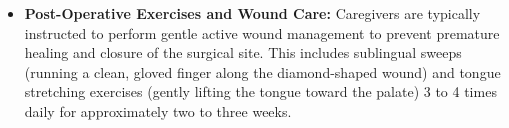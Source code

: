 \begin{itemize}
\begin{itemize}
      \item \textbf{Hemostasis:} Immediately after the cut, the infant is handed to the mother to breastfeed. Sucking and the natural composition of breast milk provide immediate pain relief, and the pressure of the tongue against the palate achieves rapid hemostasis. Any minor residual bleeding is managed with direct pressure using a sterile gauze pad.
    \end{itemize}
  \item \textbf{Post-Operative Exercises and Wound Care:} Caregivers are typically instructed to perform gentle active wound management to prevent premature healing and closure of the surgical site. This includes sublingual sweeps (running a clean, gloved finger along the diamond-shaped wound) and tongue stretching exercises (gently lifting the tongue toward the palate) 3 to 4 times daily for approximately two to three weeks.
\end{itemize}


